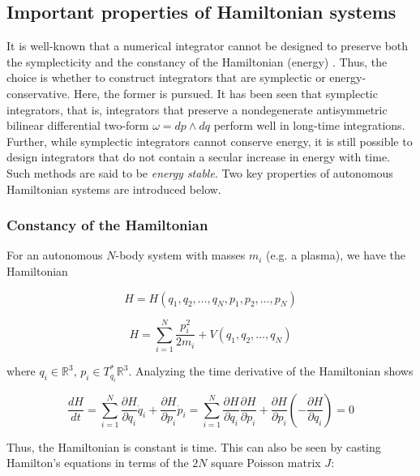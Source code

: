 \documentclass[11pt,titlepage]{report}
\begin{document}
\subsection{Important properties of Hamiltonian systems} \label{subsec:Properties_of_Hamiltonian_systems}

\indent\indent It is well-known that a numerical integrator cannot be designed to preserve both the symplecticity and the constancy of the Hamiltonian (energy) \cite{Yoshida90}. Thus, the choice is whether to construct integrators that are symplectic or energy-conservative. Here, the former is pursued. It has been seen that symplectic integrators, that is, integrators that preserve a nondegenerate antisymmetric bilinear differential two-form $\omega = dp \wedge dq$ perform well in long-time integrations. Further, while symplectic integrators cannot conserve energy, it is still possible to design integrators that do not contain a secular increase in energy with time. Such methods are said to be \emph{energy stable}. Two key properties of autonomous Hamiltonian systems are introduced below.



\subsubsection{Constancy of the Hamiltonian}

For an autonomous $N$-body system with masses $m_i$ (e.g. a plasma), we have the Hamiltonian

$$H = H(q_1,q_2,\ldots , q_N, p_1,p_2, \ldots ,p_N)$$

$$H = \sum_{i=1}^N \frac{p_i^2}{2m_i} + V(q_1,q_2,\ldots ,q_N)$$

\noindent where $q_i\in\mathbb{R}^3$, $p_i\in T_{q_i}^*\mathbb{R}^3$. Analyzing the time derivative of the Hamiltonian shows

$$\frac{dH}{dt} = \sum_{i=1}^N \frac{\partial H}{\partial q_i}\dot{q}_i + \frac{\partial H}{\partial p_i}\dot{p}_i = \sum_{i=1}^N \frac{\partial H}{\partial q_i}\frac{\partial H}{\partial p_i} + \frac{\partial H}{\partial p_i}\left(- \frac{\partial H}{\partial q_i}\right) = 0$$

\noindent Thus, the Hamiltonian is constant is time. This can also be seen by casting Hamilton's equations in terms of the $2N$ square Poisson matrix $J$:
\end{document}
